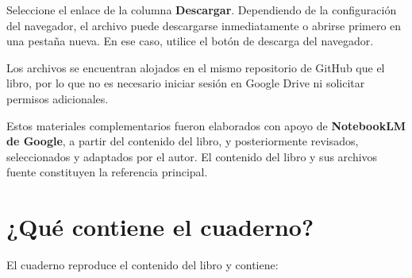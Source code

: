 \documentclass[
  spanish,
  10.5pt,
  letterpaper,
  openany,
  headings=big]{scrbook}
\begin{document}
\begin{tcolorbox}[enhanced jigsaw, arc=.35mm, bottomrule=.15mm, bottomtitle=1mm, breakable, colback=white, colbacktitle=quarto-callout-tip-color!10!white, colframe=quarto-callout-tip-color-frame, coltitle=black, left=2mm, leftrule=.75mm, opacityback=0, opacitybacktitle=0.6, rightrule=.15mm, title=\textcolor{quarto-callout-tip-color}{\faLightbulb}\hspace{0.5em}{Cómo descargar los materiales}, titlerule=0mm, toprule=.15mm, toptitle=1mm]

Seleccione el enlace de la columna \textbf{Descargar}. Dependiendo de la
configuración del navegador, el archivo puede descargarse inmediatamente
o abrirse primero en una pestaña nueva. En ese caso, utilice el botón de
descarga del navegador.

Los archivos se encuentran alojados en el mismo repositorio de GitHub
que el libro, por lo que no es necesario iniciar sesión en Google Drive
ni solicitar permisos adicionales.

\end{tcolorbox}

\begin{tcolorbox}[enhanced jigsaw, arc=.35mm, bottomrule=.15mm, bottomtitle=1mm, breakable, colback=white, colbacktitle=quarto-callout-note-color!10!white, colframe=quarto-callout-note-color-frame, coltitle=black, left=2mm, leftrule=.75mm, opacityback=0, opacitybacktitle=0.6, rightrule=.15mm, title=\textcolor{quarto-callout-note-color}{\faInfo}\hspace{0.5em}{Elaboración de los recursos}, titlerule=0mm, toprule=.15mm, toptitle=1mm]

Estos materiales complementarios fueron elaborados con apoyo de
\textbf{NotebookLM de Google}, a partir del contenido del libro, y
posteriormente revisados, seleccionados y adaptados por el autor. El
contenido del libro y sus archivos fuente constituyen la referencia
principal.

\end{tcolorbox}

\section*{¿Qué contiene el cuaderno?}\label{quuxe9-contiene-el-cuaderno}


El cuaderno reproduce el contenido del libro y contiene:
\end{document}
